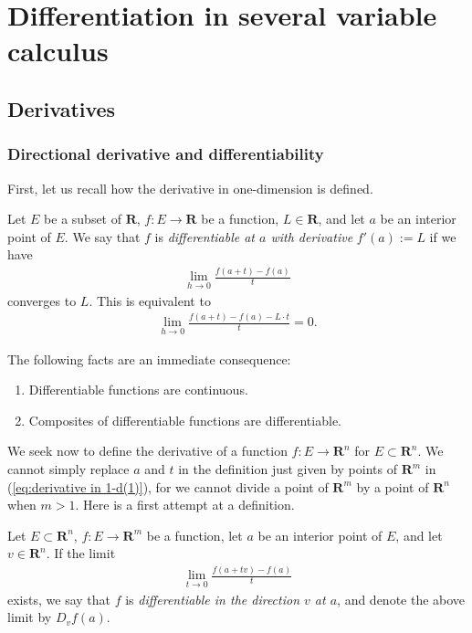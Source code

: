 
\chapter{Differentiation in several variable calculus}

\section{Derivatives}

\subsection{Directional derivative and differentiability}

First, let us recall how the derivative in one-dimension is defined.

\begin{definition}
    Let $E$ be a subset of $\mathbf{R}$, $f : E \to \mathbf{R}$ be a function, $L \in \mathbf{R}$, and let $a$ be an interior point of $E$. We say that $f$ is \emph{differentiable at $a$ with derivative} $f'(a) := L$ if we have
    \begin{align}\label{eq:derivative in 1-d(1)}
        \lim_{h \to 0}\frac{f(a + t) - f(a)}{t}
    \end{align}
converges to $L$. This is equivalent to
    \begin{align}\label{eq:derivative in 1-d(2)}
        \lim_{h \to 0}\frac{f(a + t) - f(a) - L\cdot t}{t} = 0.
    \end{align}
\end{definition}

The following facts are an immediate consequence:
\begin{enumerate}
    \item Differentiable functions are continuous.
    \item Composites of differentiable functions are differentiable.
\end{enumerate}

We seek now to define the derivative of a function $f : E \to \mathbf{R}^n$ for $E \subset \mathbf{R}^n$. We cannot simply replace $a$ and $t$ in the definition just given by points of $\mathbf{R}^m$ in (\ref{eq:derivative in 1-d(1)}), for we cannot divide a point of $\mathbf{R}^m$ by a point of $\mathbf{R}^n$ when $m > 1$. Here is a first attempt at a definition.

\begin{definition}
    Let $E \subset \mathbf{R}^n$, $f : E \to \mathbf{R}^m$ be a function, let $a$ be an interior point of $E$, and let $v \in \mathbf{R}^n$. If the limit
    \begin{align*}
        \lim_{t \to 0}\frac{f(a + tv) - f(a)}{t}
    \end{align*}
    exists, we say that $f$ is \emph{differentiable in the direction $v$ at $a$}, and denote the above limit by $D_vf(a)$.
\end{definition}

